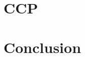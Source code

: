 \documentclass[fontsize=12pt,paper=letter,twosided,cleardoublepage=plain,final]{scrbook}
\begin{document}
\chapter{CCP}\label{s:ccp}


\afterpage{\FloatBarrier}
\afterpage{\clearpage}

\afterpage{\FloatBarrier}
\afterpage{\clearpage}

\afterpage{\FloatBarrier}
\afterpage{\clearpage}

\afterpage{\FloatBarrier}
\afterpage{\clearpage}

\afterpage{\FloatBarrier}
\afterpage{\clearpage}





\chapter{Conclusion}\label{s:thesis-concl}


%
%
%
%
%
%
%

\backmatter

\begin{spacing}{1}
    

\end{spacing}
\end{document}
